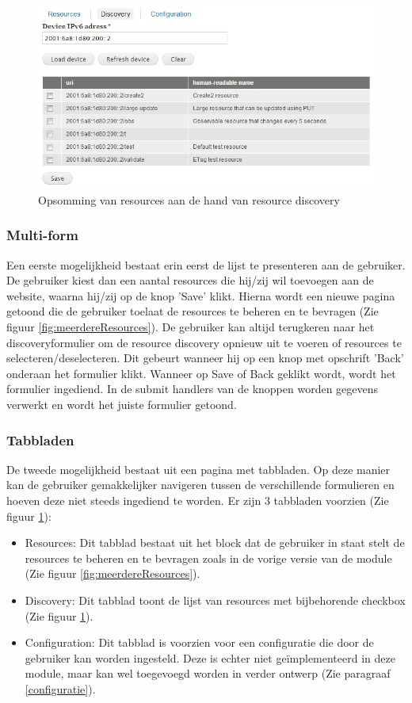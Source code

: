 \begin{figure}[h!]
\centering
\includegraphics[width=1\textwidth]{fig/tabbladen}
\caption{Opsomming van resources aan de hand van resource discovery}
\label{fig:tabbladen}
\end{figure}

\subsubsection{Multi-form}
Een eerste mogelijkheid bestaat erin eerst de lijst te presenteren aan de gebruiker. De gebruiker kiest dan een aantal resources die hij/zij wil toevoegen aan de website, waarna hij/zij op de knop 'Save' klikt. Hierna wordt een nieuwe pagina getoond die de gebruiker toelaat de resources te beheren en te bevragen (Zie figuur \ref{fig:meerdereResources}). De gebruiker kan altijd terugkeren naar het discoveryformulier om de resource discovery opnieuw uit te voeren of resources te selecteren/deselecteren. Dit gebeurt wanneer hij op een knop met opschrift 'Back' onderaan het formulier klikt. Wanneer op Save of Back geklikt wordt, wordt het formulier ingediend. In de submit handlers van de knoppen worden gegevens verwerkt en wordt het juiste formulier getoond.

\subsubsection{Tabbladen}
De tweede mogelijkheid bestaat uit een pagina met tabbladen. Op deze manier kan de gebruiker gemakkelijker navigeren tussen de verschillende formulieren en hoeven deze niet steeds ingediend te worden. Er zijn 3 tabbladen voorzien (Zie figuur \ref{fig:tabbladen}):
\begin{itemize}
\item Resources: Dit tabblad bestaat uit het block dat de gebruiker in staat stelt de resources te beheren en te bevragen zoals in de vorige versie van de module (Zie figuur \ref{fig:meerdereResources}).
\item Discovery: Dit tabblad toont de lijst van resources met bijbehorende checkbox (Zie figuur \ref{fig:tabbladen}).
\item Configuration: Dit tabblad is voorzien voor een configuratie die door de gebruiker kan worden ingesteld. Deze is echter niet ge\"{i}mplementeerd in deze module, maar kan wel toegevoegd worden in verder ontwerp (Zie paragraaf \ref{configuratie}).
\end{itemize}

